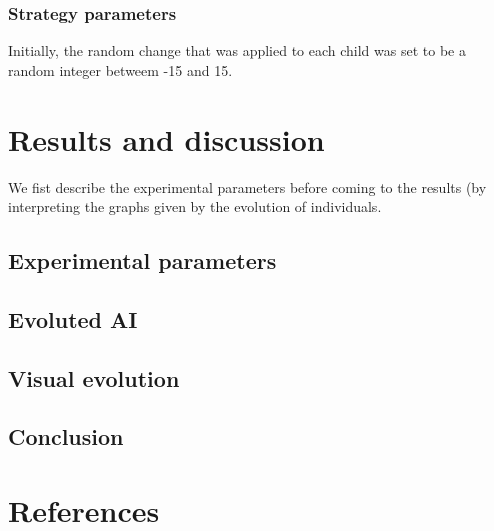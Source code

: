 \documentclass[a4paper,12pt,twocolumn]{article}
\begin{document}
\subsubsection{Strategy parameters}
Initially, the random change that was applied to each child was set to be a random integer betweem -15 and 15.

\section{Results and discussion}
We fist describe the experimental parameters before coming to the results (by interpreting the graphs given by the evolution of individuals.

\subsection{Experimental parameters}
\subsection{Evoluted AI}
\subsection{Visual evolution}
\subsection{Conclusion}

\section*{References}
\end{document}
